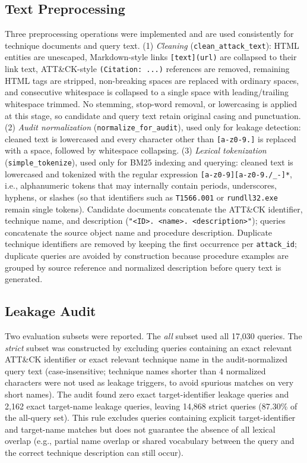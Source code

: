 \documentclass[conference]{IEEEtran}
\begin{document}
\subsection{Text Preprocessing}
Three preprocessing operations were implemented and are used consistently for technique documents and query text. (1) \emph{Cleaning} (\texttt{clean\_attack\_text}): HTML entities are unescaped, Markdown-style links \texttt{[text](url)} are collapsed to their link text, ATT\&CK-style \texttt{(Citation: ...)} references are removed, remaining HTML tags are stripped, non-breaking spaces are replaced with ordinary spaces, and consecutive whitespace is collapsed to a single space with leading/trailing whitespace trimmed. No stemming, stop-word removal, or lowercasing is applied at this stage, so candidate and query text retain original casing and punctuation. (2) \emph{Audit normalization} (\texttt{normalize\_for\_audit}), used only for leakage detection: cleaned text is lowercased and every character other than \texttt{[a-z0-9.]} is replaced with a space, followed by whitespace collapsing. (3) \emph{Lexical tokenization} (\texttt{simple\_tokenize}), used only for BM25 indexing and querying: cleaned text is lowercased and tokenized with the regular expression \texttt{[a-z0-9][a-z0-9./\_-]*}, i.e., alphanumeric tokens that may internally contain periods, underscores, hyphens, or slashes (so that identifiers such as \texttt{T1566.001} or \texttt{rundll32.exe} remain single tokens). Candidate documents concatenate the ATT\&CK identifier, technique name, and description (\texttt{"<ID>. <name>. <description>"}); queries concatenate the source object name and procedure description. Duplicate technique identifiers are removed by keeping the first occurrence per \texttt{attack\_id}; duplicate queries are avoided by construction because procedure examples are grouped by source reference and normalized description before query text is generated.

\subsection{Leakage Audit}
Two evaluation subsets were reported. The \emph{all} subset used all 17,030 queries. The \emph{strict} subset was constructed by excluding queries containing an exact relevant ATT\&CK identifier or exact relevant technique name in the audit-normalized query text (case-insensitive; technique names shorter than 4 normalized characters were not used as leakage triggers, to avoid spurious matches on very short names). The audit found zero exact target-identifier leakage queries and 2,162 exact target-name leakage queries, leaving 14,868 strict queries (87.30\% of the all-query set). This rule excludes queries containing explicit target-identifier and target-name matches but does not guarantee the absence of all lexical overlap (e.g., partial name overlap or shared vocabulary between the query and the correct technique description can still occur).
\end{document}
